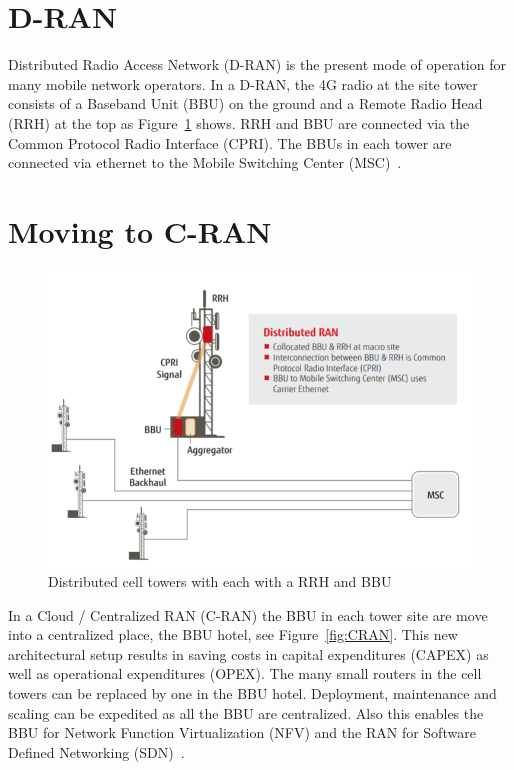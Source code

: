 \section{D-RAN}
Distributed Radio Access Network (D-RAN) is the present mode of operation for many mobile network operators.
In a D-RAN, the 4G radio at the site tower consists of a Baseband Unit (BBU) on the ground and a Remote Radio Head (RRH)
at the top as Figure~\ref{fig:DRAN} shows. RRH and BBU are connected via the Common Protocol Radio Interface (CPRI).
The BBUs in each tower are connected via ethernet to the Mobile Switching Center (MSC)~\cite{fujitsu}. 

\section{Moving to C-RAN}
\label{sec:moving_to_cran}

\begin{figure}[h]
    \centering
    \includegraphics[width=1\textwidth]{figures/DRAN.png}
    \caption{Distributed cell towers with each with a RRH and BBU~\cite{fujitsu}}
    \label{fig:DRAN}
\end{figure}

In a Cloud / Centralized RAN (C-RAN) the BBU in each tower site are move into a centralized place, the BBU hotel, see Figure~\ref{fig:CRAN}.
This new architectural setup results in saving costs in capital expenditures (CAPEX) as well as operational expenditures (OPEX). The many small routers in the cell towers
can be replaced by one in the BBU hotel. Deployment, maintenance and scaling can be expedited as all the BBU are centralized.
Also this enables the BBU for Network Function Virtualization (NFV) and the RAN for Software Defined Networking (SDN)~\cite{fujitsu}.

